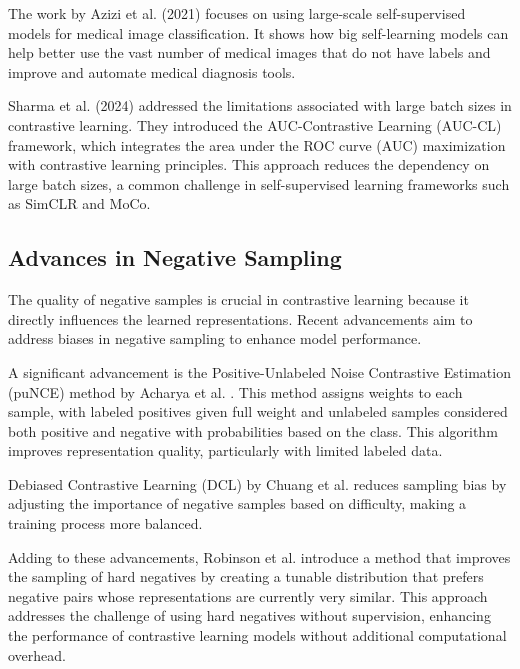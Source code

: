 The work by Azizi et al. (2021) \cite{azizi} focuses on using large-scale self-supervised models for medical image classification. It shows how big self-learning models can help better use the vast number of medical images that do not have labels and improve and automate medical diagnosis tools.

Sharma et al. (2024) \cite{sharma2023auc} addressed the limitations associated with large batch sizes in contrastive learning. They introduced the AUC-Contrastive Learning (AUC-CL) framework, which integrates the area under the ROC curve (AUC) maximization with contrastive learning principles. This approach reduces the dependency on large batch sizes, a common challenge in self-supervised learning frameworks such as SimCLR and MoCo.

\subsection{Advances in Negative Sampling}
The quality of negative samples is crucial in contrastive learning because it directly influences the learned representations. Recent advancements aim to address biases in negative sampling to enhance model performance.

A significant advancement is the Positive-Unlabeled Noise Contrastive Estimation (puNCE) method by Acharya et al. \cite{pucl}. This method assigns weights to each sample, with labeled positives given full weight and unlabeled samples considered both positive and negative with probabilities based on the class. This algorithm improves representation quality, particularly with limited labeled data.

Debiased Contrastive Learning (DCL) by Chuang et al. \cite{chuang2020debiased} reduces sampling bias by adjusting the importance of negative samples based on difficulty, making a training process more balanced.

Adding to these advancements, Robinson et al. \cite{robinson2020contrastive} introduce a method that improves the sampling of hard negatives by creating a tunable distribution that prefers negative pairs whose representations are currently very similar. This approach addresses the challenge of using hard negatives without supervision, enhancing the performance of contrastive learning models without additional computational overhead.


